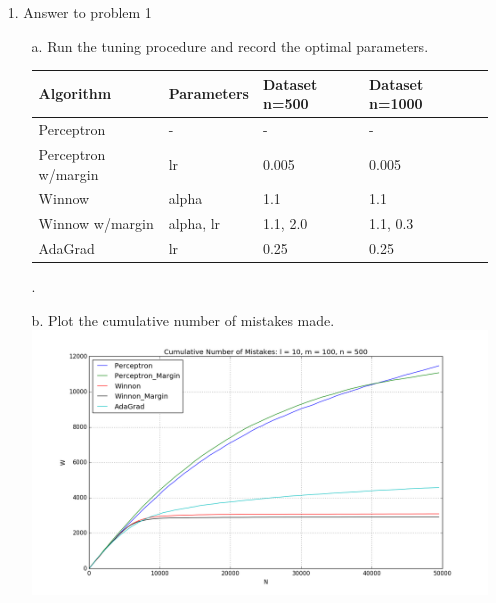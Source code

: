 
\usepackage{amsmath}
\usepackage{algorithm}%
\usepackage{algpseudocode}%
\usepackage{graphicx}
\usepackage{listings}
\graphicspath{ {.} }

\DeclareMathOperator{\proj}{proj}
\newcommand{\vctproj}[2][]{\proj_{\vec{#1}}\vec{#2}}

\oddsidemargin 0in
\evensidemargin 0in
\textwidth 6.5in
\topmargin -0.5in
\textheight 9.0in




\pagestyle{myheadings}  %

\begin{enumerate}
\item[1.] Answer to problem 1
	\begin{enumerate}
	\item[a.] Run the tuning procedure and record the optimal parameters.\\
		\begin{center}
		    \begin{tabular}{|p{4.0cm}|p{2.2cm}|p{2.5cm}|p{2.5cm}|p{2.5cm}|}
		      \hline
		      Algorithm               &  Parameters & Dataset n=500 & Dataset n=1000 \\\hline\hline
		      Perceptron              &  -          & -             & -              \\\hline
		      Perceptron w/margin     &  lr         & 0.005         & 0.005          \\\hline
		      Winnow                  &  alpha      & 1.1           & 1.1            \\\hline
		      Winnow w/margin         &  alpha, lr  & 1.1, 2.0      & 1.1, 0.3       \\\hline
		      AdaGrad                 &  lr         & 0.25          & 0.25           \\\hline
		    \end{tabular}
		\end{center}
		.\\
	\item[b.] Plot the cumulative number of mistakes made.\\
		\includegraphics[width=15cm]{figure_1} \\

\end{enumerate}
\end{enumerate}
